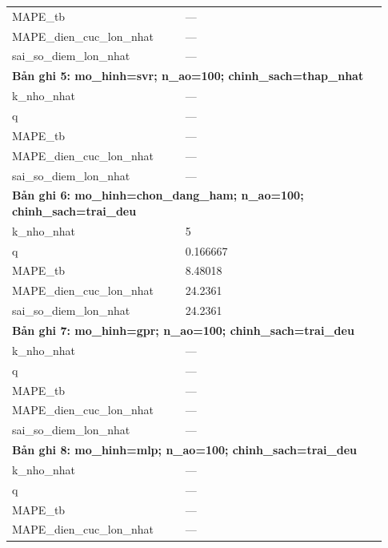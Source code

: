 \begin{longtable}{p{0.43\linewidth}p{0.50\linewidth}}
MAPE\_\allowbreak tb & — \\
MAPE\_\allowbreak dien\_\allowbreak cuc\_\allowbreak lon\_\allowbreak nhat & — \\
sai\_\allowbreak so\_\allowbreak diem\_\allowbreak lon\_\allowbreak nhat & — \\
\midrule
\multicolumn{2}{p{0.95\linewidth}}{\textbf{Bản ghi 5: mo\_hinh=svr; n\_ao=100; chinh\_sach=thap\_nhat}} \\
k\_\allowbreak nho\_\allowbreak nhat & — \\
q & — \\
MAPE\_\allowbreak tb & — \\
MAPE\_\allowbreak dien\_\allowbreak cuc\_\allowbreak lon\_\allowbreak nhat & — \\
sai\_\allowbreak so\_\allowbreak diem\_\allowbreak lon\_\allowbreak nhat & — \\
\midrule
\multicolumn{2}{p{0.95\linewidth}}{\textbf{Bản ghi 6: mo\_hinh=chon\_dang\_ham; n\_ao=100; chinh\_sach=trai\_deu}} \\
k\_\allowbreak nho\_\allowbreak nhat & 5 \\
q & 0.166667 \\
MAPE\_\allowbreak tb & 8.48018 \\
MAPE\_\allowbreak dien\_\allowbreak cuc\_\allowbreak lon\_\allowbreak nhat & 24.2361 \\
sai\_\allowbreak so\_\allowbreak diem\_\allowbreak lon\_\allowbreak nhat & 24.2361 \\
\midrule
\multicolumn{2}{p{0.95\linewidth}}{\textbf{Bản ghi 7: mo\_hinh=gpr; n\_ao=100; chinh\_sach=trai\_deu}} \\
k\_\allowbreak nho\_\allowbreak nhat & — \\
q & — \\
MAPE\_\allowbreak tb & — \\
MAPE\_\allowbreak dien\_\allowbreak cuc\_\allowbreak lon\_\allowbreak nhat & — \\
sai\_\allowbreak so\_\allowbreak diem\_\allowbreak lon\_\allowbreak nhat & — \\
\midrule
\multicolumn{2}{p{0.95\linewidth}}{\textbf{Bản ghi 8: mo\_hinh=mlp; n\_ao=100; chinh\_sach=trai\_deu}} \\
k\_\allowbreak nho\_\allowbreak nhat & — \\
q & — \\
MAPE\_\allowbreak tb & — \\
MAPE\_\allowbreak dien\_\allowbreak cuc\_\allowbreak lon\_\allowbreak nhat & — \\

\end{longtable}
